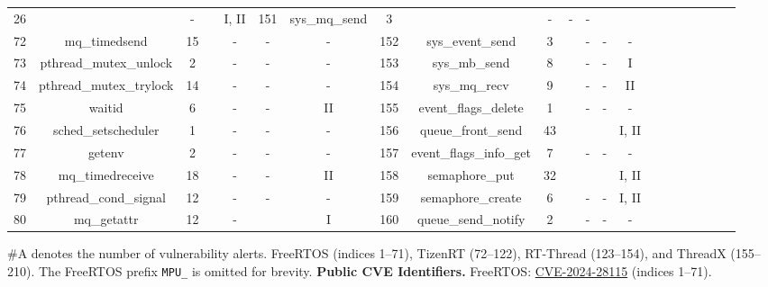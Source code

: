 \documentclass[conference]{IEEEtran}
\newcommand{\tickYes}{\ding{52}}
\begin{document}
\begin{table}[!t]
\begin{threeparttable}
\begin{tabular}{@{}ccccccccccccccccccccc@{}}
  26 &
  \tickYes &
  - &
  \tickYes &
  I, II &
  151 &
  sys\_mq\_send &
  3 &
  \tickYes &
  - &
  - &
  - &
   &
   &
   &
   &
   &
   &
   \\
   \cmidrule(l{3pt}r{3pt}){1-7}
72 &
  mq\_timedsend &
  15 &
  \tickYes &
  - &
  - &
  - &
  152 &
  sys\_event\_send &
  3 &
  \tickYes &
  - &
  - &
  - &
   &
   &
   &
   &
   &
   &
   \\
73 &
  pthread\_mutex\_unlock &
  2 &
  \tickYes &
  - &
  - &
  - &
  153 &
  sys\_mb\_send &
  8 &
  \tickYes &
  - &
  - &
  I &
   &
   &
   &
   &
   &
   &
   \\
74 &
  pthread\_mutex\_trylock &
  14 &
  \tickYes &
  - &
  - &
  - &
  154 &
  sys\_mq\_recv &
  9 &
  \tickYes &
  - &
  - &
  II &
   &
   &
   &
   &
   &
   &
   \\
\cmidrule(l{3pt}r{3pt}){8-14}
75 &
  waitid &
  6 &
  \tickYes &
  - &
  - &
  II &
  155 &
  event\_flags\_delete &
  1 &
  \tickYes &
  - &
  - &
  - &
   &
   &
   &
   &
   &
   &
   \\
76 &
  sched\_setscheduler &
  1 &
  \tickYes &
  - &
  - &
  - &
  156 &
  queue\_front\_send &
  43 &
  \tickYes &
  \tickYes &
  \tickYes &
  I, II &
   &
   &
   &
   &
   &
   &
   \\
77 &
  getenv &
  2 &
  \tickYes &
  - &
  - &
  - &
  157 &
  event\_flags\_info\_get &
  7 &
  \tickYes &
  - &
  - &
  - &
   &
   &
   &
   &
   &
   &
   \\
78 &
  mq\_timedreceive &
  18 &
  \tickYes &
  - &
  - &
  II &
  158 &
  semaphore\_put &
  32 &
  \tickYes &
  \tickYes &
  \tickYes &
  I, II &
   &
   &
   &
   &
   &
   &
   \\
79 &
  pthread\_cond\_signal &
  12 &
  \tickYes &
  - &
  - &
  - &
  159 &
  semaphore\_create &
  6 &
  \tickYes &
  - &
  - &
  I, II &
   &
   &
   &
   &
   &
   &
   \\
80 &
  mq\_getattr &
  12 &
  \tickYes &
  - &
  \tickYes &
  I &
  160 &
  queue\_send\_notify &
  2 &
  \tickYes &
  - &
  - &
  - &
   &
   &
   &
   &
   &
   &
   \\ \bottomrule
\end{tabular}%
\begin{tablenotes}[flushleft]
\scriptsize
\item \#A denotes the number of vulnerability alerts. FreeRTOS (indices 1--71), TizenRT (72--122), RT-Thread (123--154), and ThreadX (155--210). The FreeRTOS prefix \texttt{MPU\_} is omitted for brevity.
\textbf{Public CVE Identifiers.}
FreeRTOS: \href{https://www.cve.org/CVERecord?id=CVE-2024-28115}{CVE-2024-28115} (indices 1--71).

\end{tablenotes}
\end{threeparttable}
\end{table}
\end{document}
